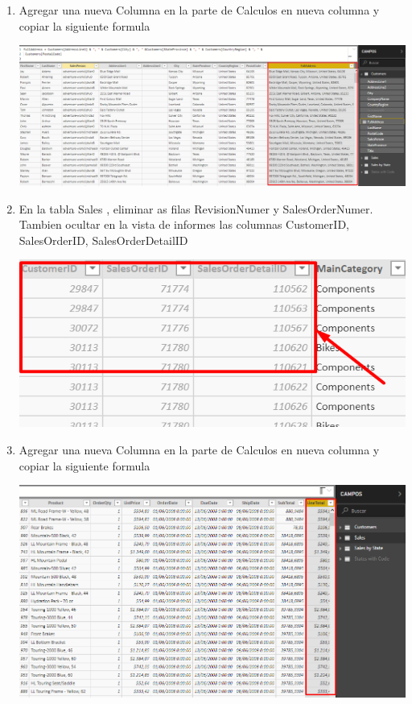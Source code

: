 \begin{itemize}
\begin{enumerate}
\item Agregar una nueva Columna en la parte de Calculos en nueva columna y copiar la siguiente formula

\begin{center}
\includegraphics[scale=1]{./Imagenes/tarea2_formula.png}
\end{center}

\item En la tabla Sales , eliminar as filas RevisionNumer y SalesOrderNumer. Tambien ocultar en la vista de informes las columnas CustomerID, SalesOrderID, SalesOrderDetailID
\begin{center}
\includegraphics[scale=0.55]{./Imagenes/29.png}
\end{center}

\item Agregar una nueva Columna en la parte de Calculos en nueva columna y copiar la siguiente formula

\begin{center}
\includegraphics[scale=1]{./Imagenes/tarea2_formula2.png}
\end{center}


\end{enumerate}
\end{itemize}
